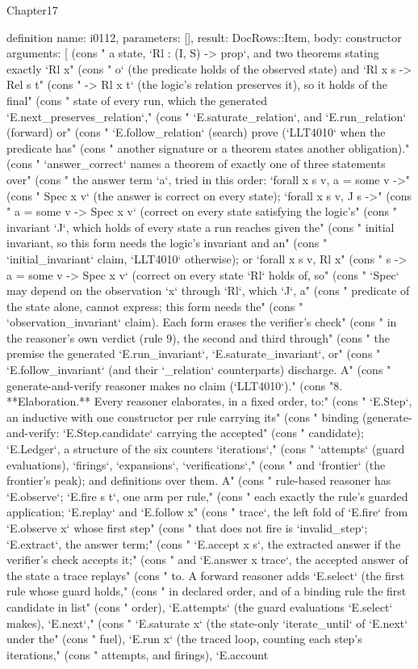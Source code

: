 \begin{lexlean}{Chapter17}
\begin{semanticmodule}
definition{
  name: i0112,
  parameters: [],
  result: DocRows::Item,
  body: constructor{
    arguments: [
      (cons "   a state, `Rl : (I, S) -> prop`, and two theorems stating exactly `Rl x" (cons "   o` (the predicate holds of the observed state) and `Rl x s -> Rel s t" (cons "   -> Rl x t` (the logic's relation preserves it), so it holds of the final" (cons "   state of every run, which the generated `E.next_preserves_relation`," (cons "   `E.saturate_relation`, and `E.run_relation` (forward) or" (cons "   `E.follow_relation` (search) prove (`LLT4010` when the predicate has" (cons "   another signature or a theorem states another obligation)." (cons "   `answer_correct` names a theorem of exactly one of three statements over" (cons "   the answer term `a`, tried in this order: `forall x s v, a = some v ->" (cons "   Spec x v` (the answer is correct on every state); `forall x s v, J s ->" (cons "   a = some v -> Spec x v` (correct on every state satisfying the logic's" (cons "   invariant `J`, which holds of every state a run reaches given the" (cons "   initial invariant, so this form needs the logic's invariant and an" (cons "   `initial_invariant` claim, `LLT4010` otherwise); or `forall x s v, Rl x" (cons "   s -> a = some v -> Spec x v` (correct on every state `Rl` holds of, so" (cons "   `Spec` may depend on the observation `x` through `Rl`, which `J`, a" (cons "   predicate of the state alone, cannot express; this form needs the" (cons "   `observation_invariant` claim). Each form erases the verifier's check" (cons "   in the reasoner's own verdict (rule 9), the second and third through" (cons "   the premise the generated `E.run_invariant`, `E.saturate_invariant`, or" (cons "   `E.follow_invariant` (and their `_relation` counterparts) discharge. A" (cons "   generate-and-verify reasoner makes no claim (`LLT4010`)." (cons "8. **Elaboration.** Every reasoner elaborates, in a fixed order, to:" (cons "   `E.Step`, an inductive with one constructor per rule carrying its" (cons "   binding (generate-and-verify: `E.Step.candidate` carrying the accepted" (cons "   candidate); `E.Ledger`, a structure of the six counters `iterations`," (cons "   `attempts` (guard evaluations), `firings`, `expansions`, `verifications`," (cons "   and `frontier` (the frontier's peak); and definitions over them. A" (cons "   rule-based reasoner has `E.observe`; `E.fire s t`, one arm per rule," (cons "   each exactly the rule's guarded application; `E.replay` and `E.follow x" (cons "   trace`, the left fold of `E.fire` from `E.observe x` whose first step" (cons "   that does not fire is `invalid_step`; `E.extract`, the answer term;" (cons "   `E.accept x s`, the extracted answer if the verifier's check accepts it;" (cons "   and `E.answer x trace`, the accepted answer of the state a trace replays" (cons "   to. A forward reasoner adds `E.select` (the first rule whose guard holds," (cons "   in declared order, and of a binding rule the first candidate in list" (cons "   order), `E.attempts` (the guard evaluations `E.select` makes), `E.next`," (cons "   `E.saturate x` (the state-only `iterate_until` of `E.next` under the" (cons "   fuel), `E.run x` (the traced loop, counting each step's iterations," (cons "   attempts, and firings), `E.account }}
\end{semanticmodule}
\end{lexlean}
